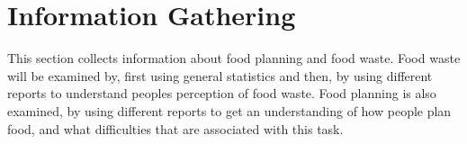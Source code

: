 \chapter{Information Gathering}\label{InformationGathering}
This section collects information about food planning and food waste. Food waste will be examined by, first using general statistics and then, by using different reports to understand peoples perception of food waste. Food planning is also examined, by using different reports to get an understanding of how people plan food, and what difficulties that are associated with this task. 
 






%



%
